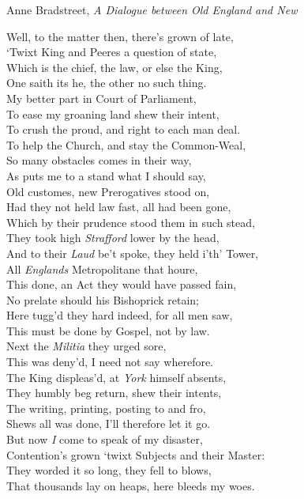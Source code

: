 \begin{texts}{Anne Bradstreet, \emph{A Dialogue between Old England and New}}
\begin{textglossed}
    Well, to the matter then, there's grown of late,\\
    `Twixt King and Peeres a question of state,\\
    Which is the chief, the law, or else the King,\\
    One saith its he, the other no such thing.\\
    My better part in Court of Parliament,\\
    To ease my groaning land shew their intent,\\
    To crush the proud, and right to each man deal.\\
    To help the Church, and stay the Common-Weal,\\
    So many obstacles comes in their way,\\
    As puts me to a stand what I should say,\\
    Old customes, new Prerogatives stood on,\\
    Had they not held law fast, all had been gone,\\
    Which by their prudence stood them in such stead,\\
    They took high \emph{Strafford} lower by the head,\\
    And to their \emph{Laud} be't spoke, they held i'th' Tower,\\
    All \emph{Englands} Metropolitane that houre,\\
    This done, an Act they would have passed fain,\\
    No prelate should his Bishoprick retain;\\
    Here tugg'd they hard indeed, for all men saw,\\
    This must be done by Gospel, not by law.\\
    Next the \emph{Militia} they urged sore,\\
    This was deny'd, I need not say wherefore.\\
    The King displeas'd, at \emph{York} himself absents,\\
    They humbly beg return, shew their intents,\\
    The writing, printing, posting to and fro,\\
    Shews all was done, I'll therefore let it go.\\
    But now \emph{I} come to speak of my disaster,\\
    Contention's grown `twixt Subjects and their Master:\\
    They worded it so long, they fell to blows,\\
    That thousands lay on heaps, here bleeds my woes.
\end{textglossed}



\end{texts}
